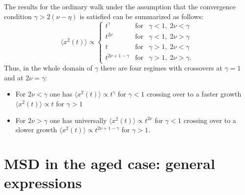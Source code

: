 The results for the ordinary walk under the assumption that the convergence condition $\gamma > 2(\nu-\eta)$ is satisfied can be summarized as follows: 
\begin{equation}
\langle x^2(t) \rangle \propto \left\{
  \begin{array}{lll}
  t^{\gamma} & \mathrm{for} & \gamma < 1, \; 2\nu < \gamma \\
t^{2\nu} & \mathrm{for} & \gamma < 1, \; 2\nu > \gamma \\
t & \mathrm{for} & \gamma > 1, \; 2\nu < \gamma \\
t^{2\nu+1- \gamma  } &\mathrm{for} &  \gamma > 1, \;2\nu > \gamma .
  \end{array}
  \right.
\label{balpoint}
\end{equation}
Thus, in the whole domain of $\gamma$ there are four regimes with crossovers at $\gamma = 1$ and at $2\nu = \gamma$:
\begin{itemize}
 \item For $2\nu < \gamma$ one has $\langle x^2(t) \rangle \propto t^{\gamma}$ for $\gamma <1$ crossing over to a faster growth $\langle x^2(t) \rangle \propto t$ for $\gamma > 1$
 \item For $2\nu > \gamma$ one has universally $\langle x^2(t) \rangle \propto t^{2\nu}$ for $\gamma <1$ crossing over to a slower growth $\langle x^2(t) \rangle \propto t^{2\nu+1-\gamma}$ for $\gamma > 1$.
\end{itemize}


\section{MSD in the aged case: general expressions }
\label{Sec:Aged}

